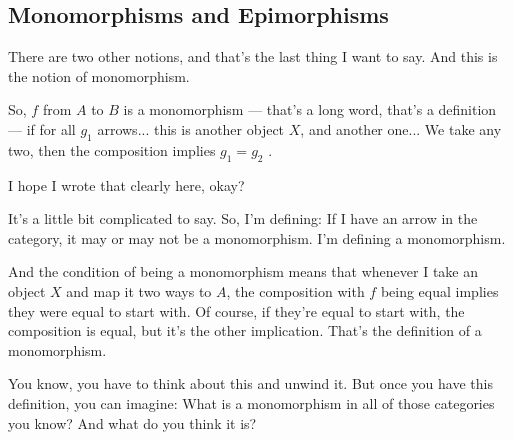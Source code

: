 \subsection{Monomorphisms and Epimorphisms}

\begin{speech}[00:05:37 - 00:07:22]
There are two other notions, and that's the last thing I want to say. And this is the notion of monomorphism. 

So, $f$ from $A$ to $B$ is a monomorphism  --- that's a long word, that's a definition --- if  for all $g_1$ arrows... this is another object $X$, and another one...  We take any two, then the composition  implies $g_1 = g_2$ .

I hope I wrote that clearly here, okay?

It's a little bit complicated to say. So, I'm defining: If I have an arrow in the category, it may or may not be a monomorphism. I'm defining a monomorphism.

And the condition of being a monomorphism means that whenever I take an object $X$ and map it two ways to $A$, the composition with $f$ being equal implies they were equal to start with. Of course, if they're equal to start with, the composition is equal, but it's the other implication. That's the definition of a monomorphism.

You know, you have to think about this and unwind it. But once you have this definition, you can imagine: What is a monomorphism in all of those categories you know? And what do you think it is?
\end{speech}

